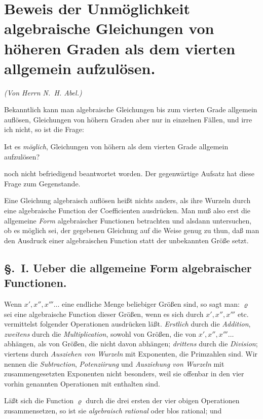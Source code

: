 \documentclass{article}
\begin{document}
\section*{Beweis der Unmöglichkeit algebraische Gleichungen von höheren Graden als dem vierten allgemein aufzulösen.}

\emph{(Von Herrn N.~H. Abel.)}

Bekanntlich kann man algebraische Gleichungen bis zum vierten Grade allgemein auflösen, Gleichungen von höhern Graden aber nur in einzelnen Fällen, und irre ich nicht, so ist die Frage:

Ist es \emph{möglich}, Gleichungen von höhern als dem vierten Grade allgemein aufzulösen?

noch nicht befriedigend beantwortet worden. Der gegenwärtige Aufsatz hat diese Frage zum Gegenstande.

Eine Gleichung algebraisch auflösen heißt nichts anders, als ihre Wurzeln durch eine algebraische Function der Coefficienten ausdrücken. Man muß also erst die allgemeine \emph{Form} algebraischer Functionen betrachten und alsdann untersuchen, ob es möglich sei, der gegebenen Gleichung auf die Weise genug zu thun, daß man den Ausdruck einer algebraischen Function statt der unbekannten Größe setzt.

\subsection*{§.~I. Ueber die allgemeine Form algebraischer Functionen.}

Wenn $x', x'', x''' \ldots$ eine endliche Menge beliebiger Größen sind, so sagt man: $\varrho$ sei eine algebraische Function dieser Größen, wenn es sich durch $x', x'', x''' $ etc. vermittelst folgender Operationen ausdrücken läßt. \emph{Erstlich} durch die \emph{Addition}, \emph{zweitens} durch die \emph{Multiplication}, sowohl von Größen, die von $x', x'', x''' \ldots$ abhängen, als von Größen, die nicht davon abhängen; \emph{drittens} durch die \emph{Division}; viertens durch \emph{Ausziehen von Wurzeln} mit Exponenten, die Primzahlen sind. Wir nennen die \emph{Subtraction}, \emph{Potenziirung} und \emph{Ausziehung von Wurzeln} mit zusammengesetzten Exponenten nicht besonders, weil sie offenbar in den vier vorhin genannten Operationen mit enthalten sind.

Läßt sich die Function $\varrho$ durch die drei ersten der vier obigen Operationen zusammensetzen, so ist sie \emph{algebraisch rational} oder blos rational; und
\end{document}
